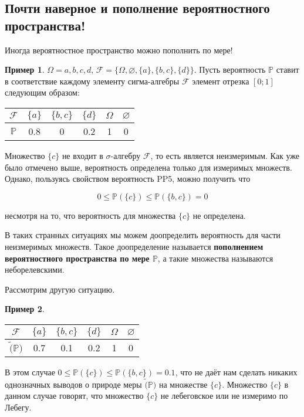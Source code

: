 \documentclass[pdftex, 12pt, a4paper]{article}
\def \mbb{\mathbb}
\def \PP{\mbb{P}}
\def\F{\ensuremath{\mathcal{F}}} %
\def\s{\ensuremath{\sigma}}
\def \Om{\Omega}
\renewcommand{\le}{\leqslant}
\theoremstyle{definition} %
\newtheorem{myex}{Пример}
\numberwithin{problem}{section}
\newcommand{\indef}[1]{\textbf{#1}}
\numberwithin{blits}{section}
\begin{document}
\subsection{Почти наверное и пополнение вероятностного пространства!}

Иногда вероятностное пространство можно пополнить по мере! 

\begin{myex}
$\Om = {a,b,c,d}$, $\F = \{\Om,\varnothing,\{a\},\{b,c\},\{d\}\}$. Пусть вероятность $\PP$ ставит в соответствие каждому элементу сигма-алгебры $\F$ элемент отрезка $[0;1]$ следующим образом: 

\begin{table}[H]
\begin{center}
\begin{tabular}{|c|c|c|c|c|c|}
\hline
$\F$ & $\{a\}$ & $\{b,c\}$ & $\{d\}$ & $\Om$ & $\varnothing$ \\
\hline
$\PP$ & 0.8 & 0 & 0.2 & 1 & 0 \\
\hline
\end{tabular}
\end{center}
\end{table} 

Множество $\{c\}$ не входит в \s-алгебру $\F$, то есть является неизмеримым. Как уже было отмечено выше, вероятность определена только для измеримых множеств. Однако, пользуясь свойством вероятность PP5, можно получить что 

\[0 \le \PP(\{c\}) \le \PP(\{b,c\}) = 0\]

несмотря на то, что вероятность для множества $\{c\}$ не определена. 
\end{myex}

В таких странных ситуациях мы можем доопределить вероятность для части неизмеримых множеств. Такое доопределение называется \indef{пополнением вероятностного пространства по мере $\PP$},  а такие множества называются неборелевскими. 

Рассмотрим другую ситуацию.


\begin{myex}

\mbox{ }

\begin{table}[H]
\begin{center}
\begin{tabular}{|c|c|c|c|c|c|}
\hline
$\F$ & $\{a\}$ & $\{b,c\}$ & $\{d\}$ & $\Om$ & $\varnothing$ \\
\hline
$\tilde(\PP)$ & 0.7 & 0.1 & 0.2 & 1 & 0 \\
\hline
\end{tabular}
\end{center}
\end{table} 

В этом случае $0 \le \PP(\{c\}) \le \PP(\{b,c\}) = 0.1$, что не даёт нам сделать никаких однозначных выводов о природе меры $\tilde(\PP)$ на множестве $\{c\}$.
Множество $\{c\}$ в данном случае говорят, что множество $\{c\}$ не лебеговское или не измеримо по Лебегу.
\end{myex}
\end{document}
